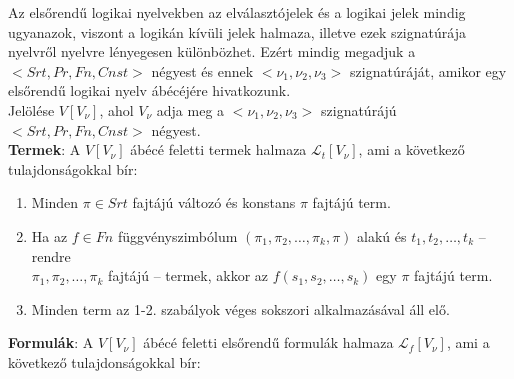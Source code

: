 \documentclass[tikz,12pt,margin=0px]{article}
\begin{document}
    \noindent Az elsőrendű logikai nyelvekben az elválasztójelek és a logikai jelek mindig ugyanazok, viszont a logikán kívüli jelek halmaza, illetve ezek szignatúrája nyelvről nyelvre lényegesen különbözhet. Ezért mindig megadjuk a $<Srt, Pr, Fn, Cnst>$ négyest és ennek $<\nu_{1}, \nu_{2}, \nu_{3}>$ szignatúráját, amikor egy elsőrendű logikai nyelv ábécéjére hivatkozunk.\\

    \noindent Jelölése $V[V_{\nu}]$, ahol $V_{\nu}$ adja meg a $<\nu_{1}, \nu_{2}, \nu_{3}>$ szignatúrájú $<Srt, Pr, Fn, Cnst>$ négyest.\\

	\noindent \textbf{Termek}: A $V[V_{\nu}]$ ábécé feletti termek halmaza $\mathcal{L}_{t}[V_{\nu}]$, ami a következő tulajdonságokkal bír:
	
	\begin{enumerate}
		\item Minden $\pi \in Srt$ fajtájú változó és konstans $\pi$ fajtájú term.
        \item Ha az $f \in Fn$ függvényszimbólum $(\pi_{1}, \pi_{2}, \ldots, \pi_{k}, \pi)$ alakú és $t_{1}, t_{2}, \ldots, t_{k}$ -- rendre\\
         $\pi_{1}, \pi_{2}, \ldots, \pi_{k}$ fajtájú -- termek, akkor az $f(s_{1}, s_{2}, \ldots, s_{k})$ egy $\pi$ fajtájú term.
		\item Minden term az 1-2. szabályok véges sokszori alkalmazásával áll elő.
	\end{enumerate}

	\noindent \textbf{Formulák}: A $V[V_{\nu}]$ ábécé feletti elsőrendű formulák halmaza $\mathcal{L}_{f}[V_{\nu}]$, ami a következő tulajdonságokkal bír:
	
\end{document}
